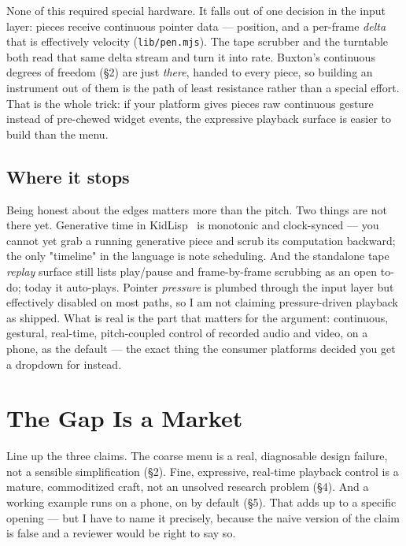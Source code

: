 \documentclass[10pt,letterpaper,twocolumn]{article}
\begin{document}
None of this required special hardware. It falls out of one decision in the input layer: pieces receive continuous pointer data --- position, and a per-frame \emph{delta} that is effectively velocity (\texttt{lib/pen.mjs}). The tape scrubber and the turntable both read that same delta stream and turn it into rate. Buxton's continuous degrees of freedom (\S2) are just \emph{there}, handed to every piece, so building an instrument out of them is the path of least resistance rather than a special effort. That is the whole trick: if your platform gives pieces raw continuous gesture instead of pre-chewed widget events, the expressive playback surface is easier to build than the menu.

\subsection{Where it stops}

Being honest about the edges matters more than the pitch. Two things are not there yet. Generative time in KidLisp~\citep{scudder2026kidlisp} is monotonic and clock-synced --- you cannot yet grab a running generative piece and scrub its computation backward; the only "timeline" in the language is note scheduling. And the standalone tape \emph{replay} surface still lists play/pause and frame-by-frame scrubbing as an open to-do; today it auto-plays. Pointer \emph{pressure} is plumbed through the input layer but effectively disabled on most paths, so I am not claiming pressure-driven playback as shipped. What is real is the part that matters for the argument: continuous, gestural, real-time, pitch-coupled control of recorded audio and video, on a phone, as the default --- the exact thing the consumer platforms decided you get a dropdown for instead.

\section{The Gap Is a Market}

Line up the three claims. The coarse menu is a real, diagnosable design failure, not a sensible simplification (\S2). Fine, expressive, real-time playback control is a mature, commoditized craft, not an unsolved research problem (\S4). And a working example runs on a phone, on by default (\S5). That adds up to a specific opening --- but I have to name it precisely, because the naive version of the claim is false and a reviewer would be right to say so.
\end{document}
